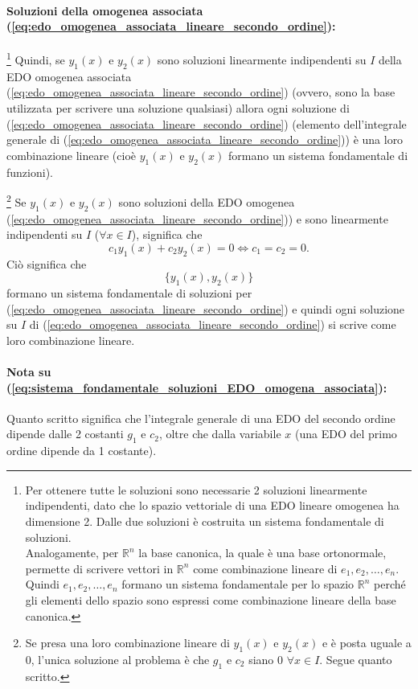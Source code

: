 \paragraph{Soluzioni della omogenea associata (\ref{eq:edo_omogenea_associata_lineare_secondo_ordine}): }\footnote{Per ottenere tutte le soluzioni sono necessarie 2 soluzioni linearmente indipendenti, dato che lo spazio vettoriale di una EDO lineare omogenea ha dimensione 2. Dalle due soluzioni è costruita un sistema fondamentale di soluzioni.\\
Analogamente, per $\mathbb R^n$ la base canonica, la quale è una \gls{base ortonormale}, permette di scrivere vettori in $\mathbb R^n$ come combinazione lineare di $e_1,e_2,\hdots, e_n$. Quindi $e_1,e_2,\hdots, e_n$ formano un sistema fondamentale per lo spazio $\mathbb R^n$ perché gli elementi dello spazio sono espressi come combinazione lineare della base canonica.} Quindi, se $y_1(x)$ e $y_2(x)$ sono soluzioni linearmente indipendenti su $I$ della EDO omogenea associata (\ref{eq:edo_omogenea_associata_lineare_secondo_ordine}) (ovvero, sono la base utilizzata per scrivere una soluzione qualsiasi) allora ogni soluzione di (\ref{eq:edo_omogenea_associata_lineare_secondo_ordine}) (elemento dell'integrale generale di (\ref{eq:edo_omogenea_associata_lineare_secondo_ordine})) è una loro combinazione lineare (cioè $y_1(x)$ e $y_2(x)$ formano un sistema fondamentale di funzioni).

\footnote{Se presa una loro combinazione lineare di $y_1(x)$ e $y_2(x)$ e è posta uguale a 0, l'unica soluzione al problema è che $g_1$ e $c_2$ siano 0 $\forall x\in I$. Segue quanto scritto.} Se $y_1(x)$ e $y_2(x)$ sono soluzioni della EDO omogenea (\ref{eq:edo_omogenea_associata_lineare_secondo_ordine})) e sono linearmente indipendenti su $I$ ($\forall x\in I$), significa che
\begin{equation*}
    c_1 y_1(x) + c_2 y_2(x) = 0 \iff c_1=c_2=0.
\end{equation*}
Ciò significa che
\begin{equation}\label{eq:sistema_fondamentale_soluzioni_EDO_omogena_associata}
    \{y_1(x), y_2(x)\}
\end{equation}
formano un sistema fondamentale di soluzioni per (\ref{eq:edo_omogenea_associata_lineare_secondo_ordine}) e quindi ogni soluzione su $I$ di (\ref{eq:edo_omogenea_associata_lineare_secondo_ordine}) si scrive come loro combinazione lineare.

\paragraph{Nota su (\ref{eq:sistema_fondamentale_soluzioni_EDO_omogena_associata}):} Quanto scritto significa che l'integrale generale di una EDO del secondo ordine dipende dalle 2 costanti $g_1$ e $c_2$, oltre che dalla variabile $x$ (una EDO del primo ordine dipende da 1 costante).

